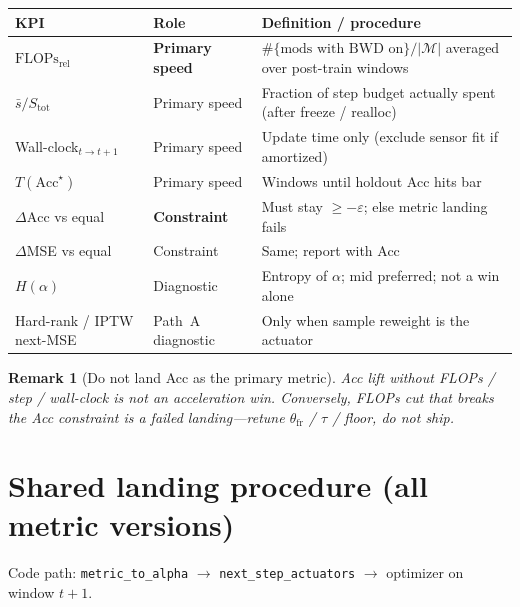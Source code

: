 \documentclass[11pt]{article}
\newtheorem{remark}{Remark}
\newcommand{\Acc}{\mathrm{Acc}}
\newcommand{\Flops}{\mathrm{FLOPs}_{\mathrm{rel}}}
\begin{document}
\begin{center}
\small
\begin{tabular}{@{}llp{6.2cm}@{}}
\toprule
KPI & Role & Definition / procedure \\
\midrule
$\Flops$
  & \textbf{Primary speed}
  & $\#\{\text{mods with BWD on}\}/|\mathcal{M}|$
    averaged over post-train windows \\
$\bar s / S_{\mathrm{tot}}$
  & Primary speed
  & Fraction of step budget actually spent
    (after freeze / realloc) \\
Wall-clock$_{t\to t+1}$
  & Primary speed
  & Update time only (exclude sensor fit if amortized) \\
$T(\Acc^\star)$
  & Primary speed
  & Windows until holdout Acc hits bar \\
$\Delta\Acc$ vs equal
  & \textbf{Constraint}
  & Must stay $\ge -\varepsilon$; else metric landing fails \\
$\Delta$MSE vs equal
  & Constraint
  & Same; report with Acc \\
$H(\alpha)$
  & Diagnostic
  & Entropy of $\alpha$; mid preferred; not a win alone \\
Hard-rank / IPTW next-MSE
  & Path~A diagnostic
  & Only when sample reweight is the actuator \\
\bottomrule
\end{tabular}
\end{center}

\begin{remark}[Do not land Acc as the primary metric]
Acc lift without FLOPs / step / wall-clock is \emph{not} an
acceleration win.
Conversely, FLOPs cut that breaks the Acc constraint is a failed
landing---retune $\theta_{\mathrm{fr}}$ / $\tau$ / floor, do not ship.
\end{remark}

\section{Shared landing procedure (all metric versions)}
\label{sec:shared}

Code path: \texttt{metric\_to\_alpha} $\to$
\texttt{next\_step\_actuators} $\to$ optimizer on window $t{+}1$.
\end{document}
